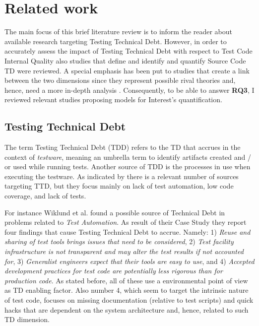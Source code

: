 \chapter{Related work} \label{related_work}

The main focus of this brief literature review is to inform the reader about available research targeting Testing Technical Debt. However, in order to accurately assess the impact of Testing Technical Debt with respect to Test Code Internal Quality also studies that define and identify and quantify Source Code TD \cite{mapping_study_td} were reviewed. A special emphasis has been put to studies that create a link between the two dimensions since they represent possible rival theories and, hence, need a more in-depth analysis \cite{case_study_guide}. Consequently, to be able to answer \textbf{RQ3}, I reviewed relevant studies proposing models for Interest's quantification.

\section{Testing Technical Debt} \label{testing_td}

The term Testing Technical Debt (TDD) refers to the TD that accrues in the context of \textit{testware}, meaning an umbrella term to identify artifacts created and / or used while running tests. Another source of TDD is the processes in use when executing the testware. As indicated by \cite{mapping_study_td, exploration_of_td, exploration_of_td2} there is a relevant number of sources targeting TTD, but they focus mainly on lack of test automation, low code coverage, and lack of tests.

For instance Wiklund et al. \cite{test_automation_td} found a possible source of Technical Debt in problems related to \textit{Test Automation}. As result of their Case Study they report four findings that cause Testing Technical Debt to accrue. Namely: 1) \textit{Reuse and sharing of test tools brings issues that need to be considered}, 2) \textit{Test facility infrastructure is not transparent and may alter the test results if not accounted for}, 3) \textit{Generalist engineers expect that their tools are easy to use}, and 4) \textit{Accepted development practices for test code are potentially less rigorous than for production code}. As stated before, all of these use a environmental point of view as TD enabling factor. Also number 4, which seem to target the intrinsic nature of test code, focuses on missing documentation (relative to test scripts) and quick hacks that are dependent on the system architecture and, hence, related to such TD dimension. 

